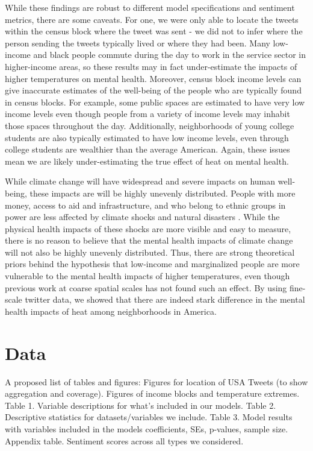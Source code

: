 \documentclass{article}
\begin{document}
While these findings are robust to different model specifications and sentiment metrics, there are some caveats.  For one, we were only able to locate the tweets within the census block where the tweet was sent - we did not to infer where the person sending the tweets typically lived or where they had been.  Many low-income and black people commute during the day to work in the service sector in higher-income areas, so these results may in fact under-estimate the impacts of higher temperatures on mental health.  Moreover, census block income levels can give inaccurate estimates of the well-being of the people who are typically found in census blocks.  For example, some public spaces are estimated to have very low income levels even though people from a variety of income levels may inhabit those spaces throughout the day.  Additionally, neighborhoods of young college students are also typically estimated to have low income levels, even through college students are wealthier than the average American.  Again, these issues mean we are likely under-estimating the true effect of heat on mental health.

While climate change will have widespread and severe impacts on human well-being, these impacts are will be highly unevenly distributed.  People with more money, access to aid and infrastructure, and who belong to ethnic groups in power are less affected by climate shocks and natural disasters \cite{bullard2012wrong}.  While the physical health impacts of these shocks are more visible and easy to measure, there is no reason to believe that the mental health impacts of climate change will not also be highly unevenly distributed.  Thus, there are strong theoretical priors behind the hypothesis that low-income and marginalized people are more vulnerable to the mental health impacts of higher temperatures, even though previous work at coarse spatial scales has not found such an effect.  By using fine-scale twitter data, we showed that there are indeed stark difference in the mental health impacts of heat among neighborhoods in America.

\section{Data}
A proposed list of tables and figures:
Figures for location of USA Tweets (to show aggregation and coverage).
Figures of income blocks and temperature extremes.
Table 1. Variable descriptions for what's included in our models.
Table 2. Descriptive statistics for datasets/variables we include.
Table 3. Model results with variables included in the models coefficients, SEs, p-values, sample size.
Appendix table. Sentiment scores across all types we considered.
\end{document}
